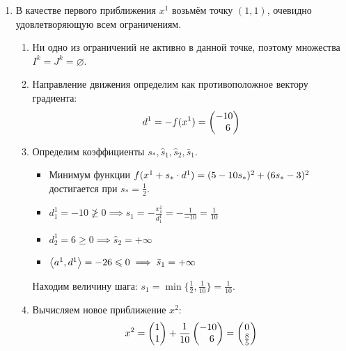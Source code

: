 \begin{enumerate}
  \renewcommand{\labelenumi}{\textbf{Итерация \arabic{enumi}.}}
  \renewcommand{\labelenumii}{\textbf{Шаг \arabic{enumii}.}}
\item
  В качестве первого приближения $x^1$ возьмём точку $(1, 1)$, очевидно
  удовлетворяющую всем ограничениям.
  \begin{enumerate}
  \item Ни одно из ограничений не активно в данной точке, поэтому
    множества $I^k = J^k = \varnothing$.
  \item Направление движения определим как противоположное вектору
    градиента:
    \begin{equation*}
      d^1 = -f(x^1) = \begin{pmatrix} -10 \\ \phm 6 \end{pmatrix}
    \end{equation*}
  \item Определим коэффициенты $s_*, \hat{s}_1, \hat{s}_2, \bar{s}_1$.
    \begin{itemize}
    \item Минимум функции $f(x^1+s_*\cdot d^1) = (5-10s_*)^2+(6s_*-3)^2$
      достигается при $s_*=\frac{1}{2}$.
    \item $d^1_1 = -10 \ngeq 0 \implies \hat{s}_1 =
      -\frac{x^1_1}{d^1_1} = -\frac{1}{-10} = \frac{1}{10}$
    \item $d^1_2 = 6 \geq 0 \implies \hat{s}_2 = +\infty$
    \item ${\left \langle a^1, d^1 \right \rangle} = -26 \leqslant
      0 \implies \bar{s}_1 = +\infty$
    \end{itemize}
    Находим величину шага: $s_1 = \min\{\frac{1}{2}, \frac{1}{10}\} =
    \frac{1}{10}$.
  \item Вычисляем новое приближение $x^2$:
    \begin{equation*}
      x^2 = \begin{pmatrix} 1 \\ 1 \end{pmatrix} +
      \frac{1}{10} \begin{pmatrix} -10 \\ \phm 6 \end{pmatrix}
      = \begin{pmatrix} 0 \\ \frac{8}{5} \end{pmatrix}
    \end{equation*}
  \end{enumerate}

\end{enumerate}
